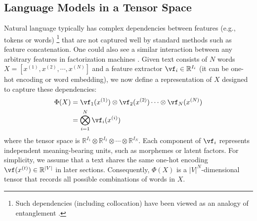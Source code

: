 \subsection{Language Models in a Tensor Space}
\label{sec:lmts}






Natural language typically has complex dependencies between features (e.g., tokens or words) \citep{hou2013mining}\footnote{Such  dependencies (including collocation) have been viewed as an analogy of entanglement \citep{hou2013mining}.} that are not captured well by standard methods such as feature concatenation.  One could also see a similar interaction between any arbitrary features in factorization machines \citep{rendle2010factorization}. Given text consists of $N$ words $X = [x^{(1)}, x^{(2)}, \cdots ,x^{(N)}]$ and a feature extractor $\vf_i \in \mathbb{R}^{I_i}$ (it can be one-hot encoding or word embedding), we now define a representation of $X$ designed to capture these dependencies:
%
\begin{equation} 
\begin{split}
    \label{eq: Phi X}
    \Phi(X) 
    &= \vf_1 (x^{(1)}) \otimes  \vf_2 (x^{(2)}) \cdots \otimes \vf_N (x^{(N)}) \\
    &= \bigotimes^N_{i=1} \vf_i (x^{(i)}) \\
\end{split}
\end{equation}
%
where the tensor space is  $\mathbb{R}^{I_1}\otimes\mathbb{R}^{I_2} \otimes\cdots\otimes\mathbb{R}^{I_N}$. Each component of $\vf_i$ represents independent meaning-bearing units, such as morphemes or latent factors.  For simplicity, we assume that a text shares the same one-hot encoding $\vf(x^{(t)}) \in \mathbb{R}^{|V|}$ in later sections. Consequently, $\Phi(X)$ is a $|V|^N$-dimensional tensor that records all possible combinations of words in $X$. 

